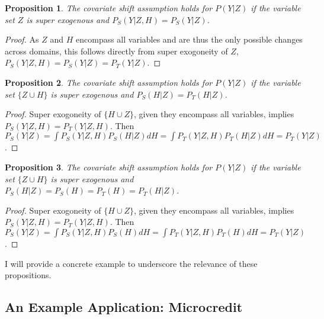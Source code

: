 \documentclass[a4paper,12pt]{article}
\newtheorem{prop}{Proposition}
\begin{document}
\begin{prop}
  The covariate shift assumption holds for $P(Y|Z)$ if the variable set $Z$ is super exogenous and $P_S(Y|Z, H) = P_S(Y | Z)$.
\end{prop}

\begin{proof}
As $Z$ and $H$ encompass all variables and are thus the only possible changes across domains, this follows directly from super exogoneity of $Z$, $P_S(Y|Z, H) = P_S(Y | Z) = P_T(Y | Z)$.
\end{proof}

\begin{prop}
  The covariate shift assumption holds for $P(Y|Z)$ if the variable set $\{ Z \cup H \}$ is super exogenous and $P_S(H|Z) = P_T(H|Z)$.
\end{prop}

\begin{proof}
  Super exogoneity of $\{H \cup Z \}$, given they encompass all variables, implies $P_S(Y|Z,H) = P_T(Y|Z,H)$. Then $P_S(Y|Z) = \int P_S(Y|Z,H)P_S(H|Z) dH = \int P_T(Y|Z,H)P_T(H|Z) dH = P_T(Y|Z)$.
\end{proof}

\begin{prop}
  The covariate shift assumption holds for $P(Y|Z)$ if the variable set $\{ Z \cup H \}$ is super exogenous and $P_S(H|Z) = P_S(H) = P_T(H) = P_T(H|Z)$.
\end{prop}

\begin{proof}
  Super exogoneity of $\{H \cup Z \}$, given they encompass all variables, implies $P_S(Y|Z,H) = P_T(Y|Z,H)$. Then $P_S(Y|Z) = \int P_S(Y|Z,H)P_S(H) dH = \int P_T(Y|Z,H)P_T(H) dH = P_T(Y|Z)$.
\end{proof}



I will provide a concrete example to underscore the relevance of these propositions.

\subsection{An Example Application: Microcredit}
\end{document}
